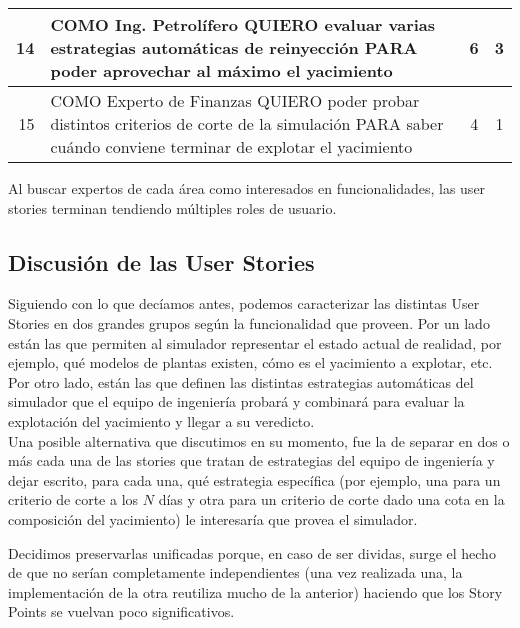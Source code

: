 \begin{center}
\begin{tabular}{| r | p{13cm} | c | c | }
    14 & COMO Ing. Petrolífero QUIERO evaluar varias estrategias automáticas de reinyección PARA poder aprovechar al máximo el yacimiento & 6 & 3\\ \hline

    15 & COMO Experto de Finanzas QUIERO poder probar distintos criterios de corte de la simulación PARA saber cuándo conviene terminar de explotar el yacimiento & 4 & 1\\ \hline
    
  \end{tabular}
\end{center}

Al buscar expertos de cada área como interesados en funcionalidades, las user stories terminan tendiendo múltiples roles de usuario.

\subsection{Discusión de las User Stories}

Siguiendo con lo que decíamos antes, podemos caracterizar las 
distintas User Stories en dos grandes grupos según la funcionalidad que proveen.  
Por un lado están las que permiten al simulador representar el estado actual de realidad, 
por ejemplo, qué modelos de plantas existen, cómo es el yacimiento a explotar, etc.
Por otro lado, están las que definen las distintas estrategias automáticas del 
simulador que el equipo de ingeniería probará y combinará para evaluar la explotación 
del yacimiento y llegar a su veredicto. \\

Una posible alternativa que discutimos en su momento, fue la de separar en dos o más cada una de las stories que tratan de estrategias del equipo de ingeniería y dejar escrito, para cada una, qué estrategia específica (por ejemplo, una para un criterio de corte a los $N$ días y otra para un criterio de corte dado una cota en la composición del yacimiento) le interesaría que provea el simulador.

Decidimos preservarlas unificadas porque, en caso de ser dividas, surge el hecho de que no serían completamente independientes (una vez realizada una, la implementación de la otra reutiliza mucho de la anterior) haciendo que los Story Points se vuelvan poco significativos.
\\

